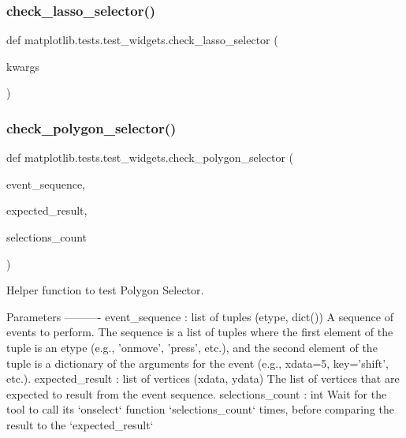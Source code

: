 \subsubsection{\texorpdfstring{check\+\_\+lasso\+\_\+selector()}{check\_lasso\_selector()}}
{\footnotesize\ttfamily def matplotlib.\+tests.\+test\+\_\+widgets.\+check\+\_\+lasso\+\_\+selector (\begin{DoxyParamCaption}\item[{}]{kwargs }\end{DoxyParamCaption})}

\mbox{\label{namespacematplotlib_1_1tests_1_1test__widgets_ab807365eb5a45add7a05b60b7a8765dc}} 
\subsubsection{\texorpdfstring{check\+\_\+polygon\+\_\+selector()}{check\_polygon\_selector()}}
{\footnotesize\ttfamily def matplotlib.\+tests.\+test\+\_\+widgets.\+check\+\_\+polygon\+\_\+selector (\begin{DoxyParamCaption}\item[{}]{event\+\_\+sequence,  }\item[{}]{expected\+\_\+result,  }\item[{}]{selections\+\_\+count }\end{DoxyParamCaption})}

\begin{DoxyVerb}Helper function to test Polygon Selector.

Parameters
----------
event_sequence : list of tuples (etype, dict())
    A sequence of events to perform. The sequence is a list of tuples
    where the first element of the tuple is an etype (e.g., 'onmove',
    'press', etc.), and the second element of the tuple is a dictionary of
     the arguments for the event (e.g., xdata=5, key='shift', etc.).
expected_result : list of vertices (xdata, ydata)
    The list of vertices that are expected to result from the event
    sequence.
selections_count : int
    Wait for the tool to call its `onselect` function `selections_count`
    times, before comparing the result to the `expected_result`
\end{DoxyVerb}
 \mbox{\label{namespacematplotlib_1_1tests_1_1test__widgets_aac82758f0a7de8b914762ffb9f694d39}} 
